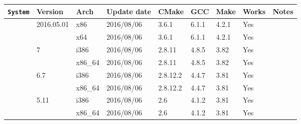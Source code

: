 \documentclass[11pt,twoside,openany,x11names,svgnames]{memoir}
\begin{document}
{\footnotesize
\begin{longtable}{| >{\bfseries}p{3cm} | p{2.6cm} | p{1cm} | p{1.5cm} | p{1cm} | p{0.7cm} | p{0.7cm} | p{0.8cm} | p{1.5cm} |}
	\hline
	
	\texttt{System}                               & Version                        & Arch   & Update date & CMake  & GCC   & Make  & Works & Notes \\
	
	\hline
	\hline
	
	\multirow{2}{*}{\texttt{Arch Linux}}          & \multirow{2}{*}{2016.05.01}    & x86    & 2016/08/06  & 3.6.1    & 6.1.1 & 4.2.1 & Yes   &  \\
											    							       \cline{3-8}
	                                              &                                & x64    & 2016/08/06  & 3.6.1    & 6.1.1 & 4.2.1 & Yes   &  \\
	                                             
	\hline
	\hline
	
	\multirow{6}{*}{\texttt{CentOS}}              & \multirow{2}{*}{7}             & i386   & 2016/08/06  & 2.8.11   & 4.8.5 & 3.82  & Yes   &  \\
																		           \cline{3-8}
	                                              &                                & x86\_64& 2016/08/06  & 2.8.11   & 4.8.5 & 3.82  & Yes   &  \\
	                                              \cline{2-8}
	                                              & \multirow{2}{*}{6.7}           & i386   & 2016/08/06  & 2.8.12.2 & 4.4.7 & 3.81  & Yes   &  \\
	                                         							           \cline{3-8}
	                                              &                                & x86\_64& 2016/08/06  & 2.8.12.2 & 4.4.7 & 3.81  & Yes   &  \\
	                                              \cline{2-8}
	                                              & \multirow{2}{*}{5.11}          & i386   & 2016/08/06  & 2.6      & 4.1.2 & 3.81  & Yes   &  \\
	                                         							           \cline{3-8}
	                                              &                                & x86\_64& 2016/08/06  & 2.6      & 4.1.2 & 3.81  & Yes   &  \\
	                                             
	\hline
	\hline
	

\end{longtable}}
\end{document}
